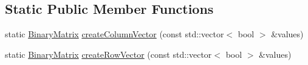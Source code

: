 \subsection*{Static Public Member Functions}
\begin{DoxyCompactItemize}
\item 
static \hyperlink{classopen_mind_1_1math_1_1_binary_matrix}{Binary\+Matrix} \hyperlink{classopen_mind_1_1math_1_1_binary_matrix_a80e3008f5df9b2c18185cc6386b9b23a}{create\+Column\+Vector} (const std\+::vector$<$ bool $>$ \&values)
\item 
static \hyperlink{classopen_mind_1_1math_1_1_binary_matrix}{Binary\+Matrix} \hyperlink{classopen_mind_1_1math_1_1_binary_matrix_ac2bde31f64020f0a24d74cf8862e8a04}{create\+Row\+Vector} (const std\+::vector$<$ bool $>$ \&values)
\end{DoxyCompactItemize}


